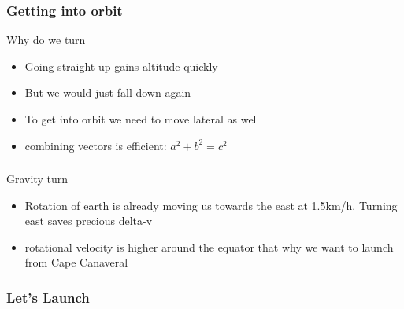 {
%
\begin{frame}
\end{frame}
\begin{frame}
    \frametitle{Getting into orbit}
    \begin{block}{Why do we turn}
        \begin{itemize}
            \item Going straight up gains altitude quickly
            \item But we would just fall down again
            \item To get into orbit we need to move lateral as well
            \item combining vectors is efficient: $a^2+b^2=c^2$
        \end{itemize}
    \end{block}
\end{frame}
\begin{frame}
    \frametitle{}
    \begin{block}{Gravity turn}
        \begin{itemize}
            \item Rotation of earth is already moving us towards the east at 1.5km/h. Turning east saves precious delta-v
            \item rotational velocity is higher around the equator that why we want to launch from Cape Canaveral
        \end{itemize}
    \end{block}
\end{frame}
\begin{frame}
    \frametitle{Let's Launch}

\end{frame}}
